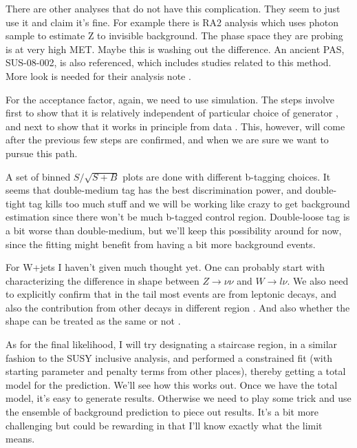 There are other analyses that do not have this complication.  They seem to just use it and claim it's fine.
For example there is RA2 analysis which uses photon sample to estimate Z to invisible background.
The phase space they are probing is at very high MET.  Maybe this is washing out the difference.
An ancient PAS, SUS-08-002, is also referenced, which includes studies related to this method.
More look is needed for their analysis note \ActionItem .

For the acceptance factor, again, we need to use simulation.  The steps involve first to show that
it is relatively independent of particular choice of generator \ActionItem , and next to show that it works
in principle from data \ActionItem .  This, however, will come after the previous few steps are confirmed,
and when we are sure we want to pursue this path.



A set of binned $S/\sqrt{S+B}$ plots are done with different b-tagging choices.
It seems that double-medium tag has the best discrimination power, and double-tight tag kills too much stuff
and we will be working like crazy to get background estimation since there won't be much b-tagged control region.
Double-loose tag is a bit worse than double-medium, but we'll keep this possibility around for now,
since the fitting might benefit from having a bit more background events.



For W+jets I haven't given much thought yet.  One can probably start with characterizing the difference in shape
between $Z\rightarrow\nu\nu$ and $W\rightarrow l\nu$.  We also need to explicitly confirm that in the tail
most events are from leptonic decays, and also the contribution from other decays in different region \ActionItem .
And also whether the shape can be treated as the same or not \ActionItem .

As for the final likelihood, I will try designating a staircase region, in a similar fashion to the SUSY inclusive
analysis, and performed a constrained fit (with starting parameter and penalty terms
from other places), thereby getting a total model for the prediction.  We'll see how this
works out.  Once we have the total model, it's easy to generate results.
Otherwise we need to play some trick and use the ensemble of background prediction to piece out
results.  It's a bit more challenging but could be rewarding in that I'll know exactly what
the limit means.

